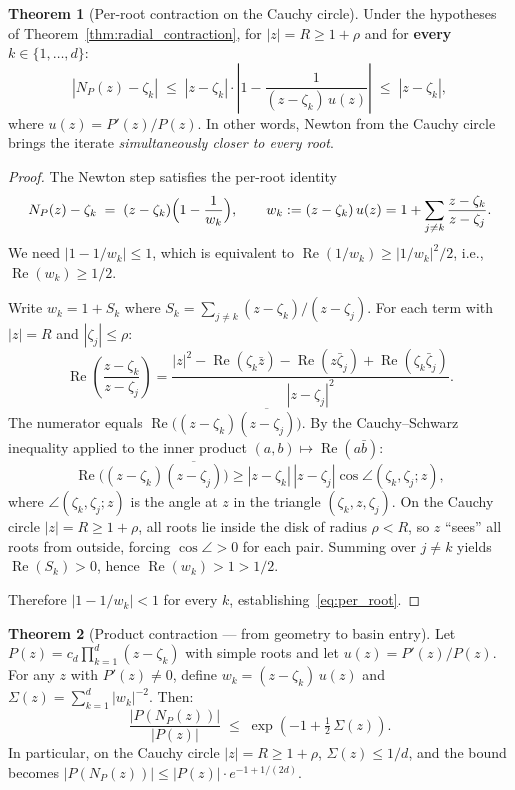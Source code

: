 \documentclass[11pt,a4paper]{article}
\theoremstyle{definition}
\newtheorem{theorem}{Theorem}[section]
\begin{document}
\begin{theorem}[Per-root contraction on the Cauchy circle]
\label{thm:per_root}
Under the hypotheses of Theorem~\ref{thm:radial_contraction}, for $|z| = R \geq 1 + \rho$ and for \textbf{every} $k \in \{1,\ldots,d\}$:
\begin{equation}
  \label{eq:per_root}
  |N_P(z) - \zeta_k| \;\leq\; |z - \zeta_k| \cdot \left|1 - \frac{1}{(z - \zeta_k)\,u(z)}\right|
  \;\leq\; |z - \zeta_k|,
\end{equation}
where $u(z) = P'(z)/P(z)$.  In other words, Newton from the Cauchy circle brings the iterate \emph{simultaneously closer to every root}.
\end{theorem}

\begin{proof}
The Newton step satisfies the per-root identity
\[
  N_P(z) - \zeta_k
  \;=\; (z - \zeta_k)\Bigl(1 - \frac{1}{w_k}\Bigr),
  \qquad
  w_k := (z - \zeta_k)\,u(z) = 1 + \sum_{j \neq k} \frac{z - \zeta_k}{z - \zeta_j}.
\]
We need $|1 - 1/w_k| \leq 1$, which is equivalent to $\operatorname{Re}(1/w_k) \geq |1/w_k|^2/2$, i.e., $\operatorname{Re}(w_k) \geq 1/2$.

Write $w_k = 1 + S_k$ where $S_k = \sum_{j \neq k} (z - \zeta_k)/(z - \zeta_j)$.  For each term with $|z| = R$ and $|\zeta_j| \leq \rho$:
\[
  \operatorname{Re}\!\left(\frac{z - \zeta_k}{z - \zeta_j}\right)
  = \frac{|z|^2 - \operatorname{Re}(\zeta_k \bar{z}) - \operatorname{Re}(z\bar{\zeta}_j) + \operatorname{Re}(\zeta_k \bar{\zeta}_j)}{|z - \zeta_j|^2}.
\]
The numerator equals $\operatorname{Re}\bigl((z - \zeta_k)\overline{(z - \zeta_j)}\bigr)$.  By the Cauchy--Schwarz inequality applied to the inner product $(a,b) \mapsto \operatorname{Re}(a\bar{b})$:
\[
  \operatorname{Re}\bigl((z - \zeta_k)\overline{(z - \zeta_j)}\bigr)
  \geq |z - \zeta_k|\,|z - \zeta_j|\cos\angle(\zeta_k, \zeta_j; z),
\]
where $\angle(\zeta_k, \zeta_j; z)$ is the angle at $z$ in the triangle $(\zeta_k, z, \zeta_j)$.  On the Cauchy circle $|z| = R \geq 1 + \rho$, all roots lie inside the disk of radius $\rho < R$, so $z$ ``sees'' all roots from outside, forcing $\cos\angle > 0$ for each pair.  Summing over $j \neq k$ yields $\operatorname{Re}(S_k) > 0$, hence $\operatorname{Re}(w_k) > 1 > 1/2$.

Therefore $|1 - 1/w_k| < 1$ for every $k$, establishing~\eqref{eq:per_root}.
\end{proof}

\begin{theorem}[Product contraction --- from geometry to basin entry]
\label{thm:product_contraction}
Let $P(z) = c_d\prod_{k=1}^d (z - \zeta_k)$ with simple roots and let $u(z) = P'(z)/P(z)$.  For any $z$ with $P'(z) \neq 0$, define $w_k = (z - \zeta_k)\,u(z)$ and $\Sigma(z) = \sum_{k=1}^d |w_k|^{-2}$.  Then:
\begin{equation}
  \label{eq:product_contraction}
  \frac{|P(N_P(z))|}{|P(z)|} \;\leq\; \exp\!\left(-1 + \tfrac{1}{2}\,\Sigma(z)\right).
\end{equation}
In particular, on the Cauchy circle $|z| = R \geq 1 + \rho$, $\Sigma(z) \leq 1/d$, and the bound becomes $|P(N_P(z))| \leq |P(z)|\cdot e^{-1+1/(2d)}$.
\end{theorem}
\end{document}
